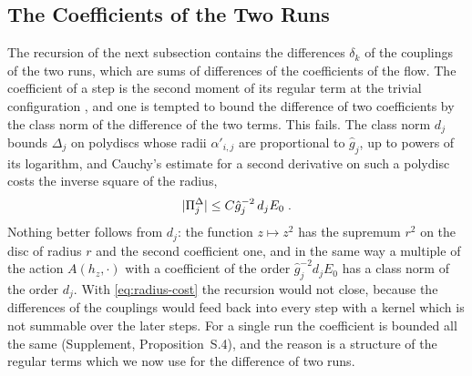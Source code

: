 \documentclass[11pt]{preprint}
\DeclarePairedDelimiter{\abs}{\lvert}{\rvert}
\numberwithin{equation}{section}
\theoremstyle{definition}
\theoremstyle{remark}
\theoremstyle{plain}
\begin{document}
\subsection{The Coefficients of the Two Runs}\label{sec:coefficient-difference}

The recursion of the next subsection contains the differences $\delta_k$ of the couplings of the two runs, which are sums of differences of the coefficients of the flow. The coefficient of a step is the second moment of its regular term at the trivial configuration \cite[(3.57)--(3.64), pp.~281--283]{BalabanCRE}, and one is tempted to bound the difference of two coefficients by the class norm of the difference of the two terms. This fails. The class norm $d_j$ bounds $\Delta_j$ on polydiscs whose radii $\alpha'_{i,j}$ are proportional to $\hat g_j$, up to powers of its logarithm, and Cauchy's estimate for a second derivative on such a polydisc costs the inverse square of the radius,
\begin{equation}\label{eq:radius-cost}
    \abs{\Pi^\Delta_j} \leq C\hat g_j^{-2}\,d_jE_0\;.
\end{equation}
Nothing better follows from $d_j$: the function $z \mapsto z^2$ has the supremum $r^2$ on the disc of radius $r$ and the second coefficient one, and in the same way a multiple of the action $A(h_z, \cdot)$ with a coefficient of the order $\hat g_j^{-2}d_jE_0$ has a class norm of the order $d_j$. With \eqref{eq:radius-cost} the recursion would not close, because the differences of the couplings would feed back into every step with a kernel which is not summable over the later steps. For a single run the coefficient is bounded all the same (Supplement, Proposition~S.4), and the reason is a structure of the regular terms which we now use for the difference of two runs.
\end{document}
